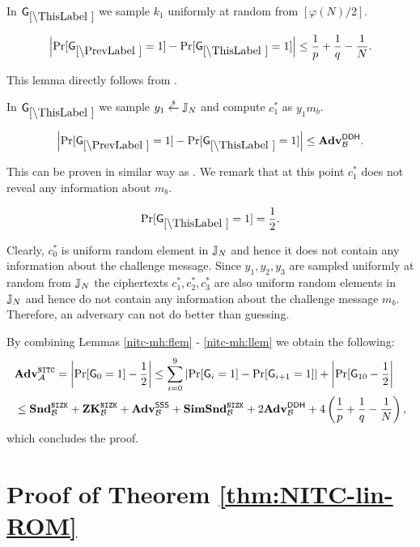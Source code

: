 In $\games_\thisgame$ we sample $k_1$ uniformly at random from $[\varphi(N)/2]$. 

\begin{lemma}
\[
\left|\Pr[\games_\prevgame = 1] - \Pr[\games_\thisgame = 1]\right| \leq \frac{1}{p}+\frac{1}{q}-\frac{1}{N}.
\]
\end{lemma}

This lemma directly follows from .

In $\games_\thisgame$ we sample $y_1 \stackrel{{\scriptscriptstyle\$}}{\leftarrow} \mathbb{J}_N$ and compute $c_1^*$ as  $y_1 m_b$. 

\begin{lemma}
\[
\left|\Pr[\games_\prevgame = 1] - \Pr[\games_\thisgame = 1]\right| \leq \advtg_\advB^\ddh.
\]
\end{lemma}
This can be proven in similar way as . We remark that at this point $c_1^*$ does not reveal any information about $m_b$.

\begin{lemma}\label{nitc-mh:llem}
\[
\Pr[\games_\thisgame = 1] = \half.
\]
\end{lemma}

Clearly, $c_0^*$ is uniform random element in $\mathbb{J}_N$ and hence it does not contain any information about the challenge message. Since $y_1, y_2, y_3$ are sampled uniformly at random from $\mathbb{J}_N$ the ciphertexts $c_1^*, c_2^*, c_3^*$ are also uniform random elements in $\mathbb{J}_N$ and hence do not contain any information about the challenge message $m_b$. Therefore, an adversary can not do better than guessing.

By combining Lemmas \ref{nitc-mh:flem} - \ref{nitc-mh:llem} we obtain the following:
\begin{align*}
&\mathbf{Adv}^{\mathtt{NITC}}_{\mathcal{A}} = \left| \Pr[\mathsf{G}_0 = 1] - \frac{1}{2} \right| \leq \sum_{i=0}^9 \left|\Pr[\mathsf{G}_i = 1] - \Pr[\mathsf{G}_{i+1} = 1] \right| + \left|\Pr[\mathsf{G}_{10}- \frac{1}{2}\right| \\
 &\leq \mathbf{Snd}^{\mathtt{NIZK}}_{\mathcal{B}} + \mathbf{ZK}^{\mathtt{NIZK}}_{\mathcal{B}} + \mathbf{Adv}^{\mathsf{SSS}}_{\mathcal{B}} + \mathbf{SimSnd}^{\mathtt{NIZK}}_{\mathcal{B}} + 2 \mathbf{Adv}^{\mathsf{DDH}}_{\mathcal{B}} + 4 \left( \frac{1}{p}+\frac{1}{q}-\frac{1}{N} \right),
\end{align*}
which concludes the proof.



\section{Proof of Theorem \ref{thm:NITC-lin-ROM}} %
\label{app:NITC-lin-ROM}

